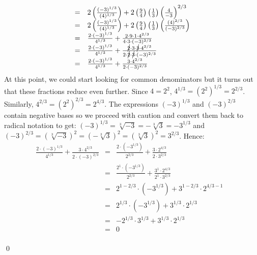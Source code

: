 \documentclass{ximera}
\begin{document}
\begin{example}
\begin{enumerate}
\[\begin{array}{rclr}
& = & 2 \left(\frac{(-3)^{1/3}}{(4)^{1/3}} \right) + 2\left(\frac{9}{4}\right)\left(\frac{1}{3}\right)\left(\frac{4}{-3}\right)^{2/3} & \\  

& = & 2 \left(\frac{(-3)^{1/3}}{(4)^{1/3}} \right) + 2\left(\frac{9}{4}\right)\left(\frac{1}{3}\right)\left(\frac{(4)^{2/3}}{(-3)^{2/3}}\right) & \\  

& = & \frac{2 \cdot (-3)^{1/3}}{4^{1/3}} + \frac{2 \cdot 9 \cdot 1 \cdot 4^{2/3}}{4 \cdot 3 \cdot (-3)^{2/3}} & \\  

& = & \frac{2 \cdot (-3)^{1/3}}{4^{1/3}} + \frac{\cancel{2} \cdot 3 \cdot \cancel{3} \cdot 4^{2/3}}{2 \cdot \cancel{2} \cdot \cancel{3} \cdot (-3)^{2/3}} & \\  

& = & \frac{2 \cdot (-3)^{1/3}}{4^{1/3}} + \frac{3 \cdot 4^{2/3}}{2 \cdot (-3)^{2/3}} & \\ \end{array} \] At this point, we could start looking for common denominators but it turns out that these fractions reduce even further.  Since $4 = 2^2$, $4^{1/3} = (2^2)^{1/3} = 2^{2/3}$.  Similarly, $4^{2/3} = (2^2)^{2/3} = 2^{4/3}$. The expressions $(-3)^{1/3}$ and $(-3)^{2/3}$ contain negative bases so we proceed with caution and convert them back to radical notation to get:  $(-3)^{1/3} = \sqrt[3]{-3} = -\sqrt[3]{3} = - 3^{1/3}$ and  $(-3)^{2/3} = (\sqrt[3]{-3})^2 = (-\sqrt[3]{3})^2 =(\sqrt[3]{3})^2 = 3^{2/3}$.  Hence:\[ \begin{array}{rclr}

\frac{2 \cdot (-3)^{1/3}}{4^{1/3}} + \frac{3 \cdot 4^{2/3}}{2 \cdot (-3)^{2/3}} & = & \frac{2 \cdot (-3^{1/3})}{2^{2/3}} + \frac{3 \cdot 2^{4/3}}{2 \cdot 3^{2/3}}  & \\  

& = & \frac{2^{1} \cdot (-3^{1/3})}{2^{2/3}} + \frac{3^{1} \cdot 2^{4/3}}{2^{1} \cdot 3^{2/3}}  & \\  

& = & 2^{1 - 2/3} \cdot (-3^{1/3}) +3^{1- 2/3} \cdot 2^{4/3 - 1}  & \\  

& = & 2^{1/3} \cdot (-3^{1/3}) +3^{1/3} \cdot 2^{1/3}  & \\  

& = &  - 2^{1/3} \cdot 3^{1/3} +3^{1/3} \cdot 2^{1/3}  & \\  

& = & 0 & \\ \end{array} \] 

\vspace{-.3in} \qed

\end{enumerate}

\end{example}
\end{document}
